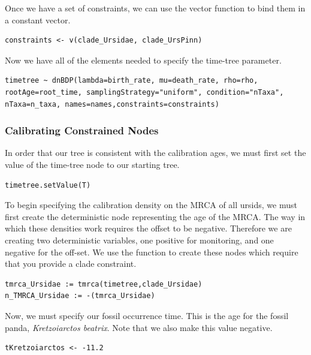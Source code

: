 Once we have a set of constraints, we can use the vector function  to bind them in a constant vector.
{\tt \begin{snugshade*}
\begin{lstlisting}
constraints <- v(clade_Ursidae, clade_UrsPinn)
\end{lstlisting}
\end{snugshade*}}

Now we have all of the elements needed to specify the time-tree parameter.
{\tt \begin{snugshade*}
\begin{lstlisting}
timetree ~ dnBDP(lambda=birth_rate, mu=death_rate, rho=rho, rootAge=root_time, samplingStrategy="uniform", condition="nTaxa", nTaxa=n_taxa, names=names,constraints=constraints)
\end{lstlisting}
\end{snugshade*}}


\subsubsection{Calibrating Constrained Nodes}

In order that our tree is consistent with the calibration ages, we must first set the value of the time-tree node to our starting tree.
{\tt \begin{snugshade*}
\begin{lstlisting}
timetree.setValue(T)
\end{lstlisting}
\end{snugshade*}}

To begin specifying the calibration density on the MRCA of all ursids, we must first create the deterministic node representing the age of the MRCA.
The way in which these densities work requires the offset to be negative. 
Therefore we are creating two deterministic variables, one positive for monitoring, and one negative for the off-set.
We use the  function to create these nodes which require that you provide a clade constraint.
{\tt \begin{snugshade*}
\begin{lstlisting}
tmrca_Ursidae := tmrca(timetree,clade_Ursidae)
n_TMRCA_Ursidae := -(tmrca_Ursidae)
\end{lstlisting}
\end{snugshade*}}

Now, we must specify our fossil occurrence time.
This is the age for the fossil panda, \textit{Kretzoiarctos beatrix}.
Note that we also make this value negative.
{\tt \begin{snugshade*}
\begin{lstlisting}
tKretzoiarctos <- -11.2
\end{lstlisting}
\end{snugshade*}}

